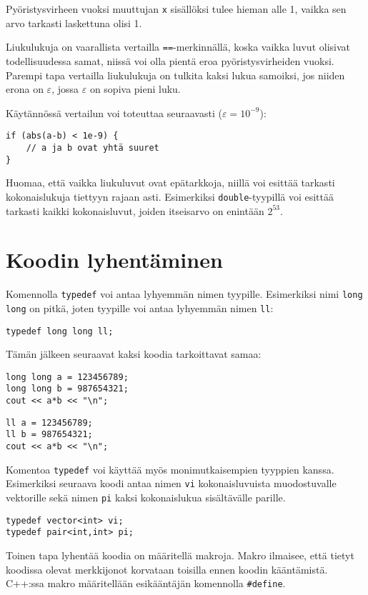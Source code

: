 Pyöristysvirheen vuoksi muuttujan \texttt{x}
sisällöksi tulee hieman alle 1,
vaikka sen arvo tarkasti laskettuna olisi 1.

Liukulukuja on vaarallista vertailla \texttt{==}-merkinnällä,
koska vaikka luvut olisivat todellisuudessa samat,
niissä voi olla pientä eroa pyöristysvirheiden vuoksi.
Parempi tapa vertailla liukulukuja on
tulkita kaksi lukua samoiksi, jos niiden erona on $\varepsilon$,
jossa $\varepsilon$ on sopiva pieni luku.

Käytännössä vertailun voi toteuttaa seuraavasti ($\varepsilon=10^{-9}$):

\begin{lstlisting}
if (abs(a-b) < 1e-9) {
    // a ja b ovat yhtä suuret
}
\end{lstlisting}

Huomaa, että
vaikka liukuluvut ovat epätarkkoja, niillä voi esittää
tarkasti kokonaislukuja tiettyyn rajaan asti.
Esimerkiksi \texttt{double}-tyypillä voi esittää
tarkasti kaikki kokonaisluvut, joiden itseisarvo
on enintään $2^{53}$.

\section{Koodin lyhentäminen}

Komennolla \texttt{typedef} voi antaa lyhyemmän
nimen tyypille.
Esimerkiksi nimi \texttt{long long} on pitkä,
joten tyypille voi antaa lyhyemmän nimen \texttt{ll}:
\begin{lstlisting}
typedef long long ll;
\end{lstlisting}
Tämän jälkeen seuraavat kaksi koodia tarkoittavat samaa:
\begin{lstlisting}
long long a = 123456789;
long long b = 987654321;
cout << a*b << "\n";
\end{lstlisting}
\begin{lstlisting}
ll a = 123456789;
ll b = 987654321;
cout << a*b << "\n";
\end{lstlisting}
Komentoa \texttt{typedef} voi käyttää myös
monimutkaisempien tyyppien kanssa.
Esimerkiksi seuraava koodi antaa nimen \texttt{vi}
kokonaisluvuista muodostuvalle vektorille
sekä nimen \texttt{pi} kaksi
kokonaislukua sisältävälle parille.
\begin{lstlisting}
typedef vector<int> vi;
typedef pair<int,int> pi;
\end{lstlisting}

Toinen tapa lyhentää koodia on määritellä makroja.
Makro ilmaisee, että tietyt koodissa olevat
merkkijonot korvataan toisilla ennen koodin
kääntämistä.
C++:ssa makro määritellään
esikääntäjän komennolla \texttt{\#define}.

